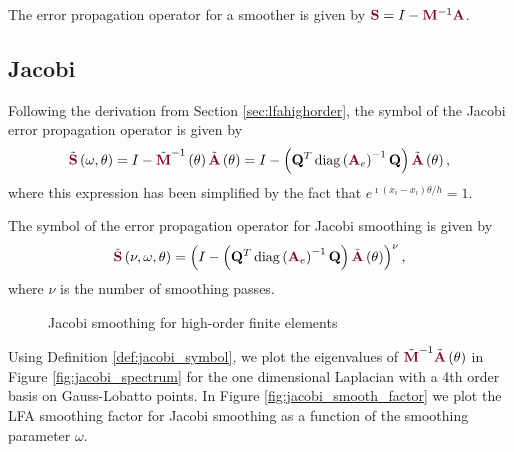 The error propagation operator for a smoother is given by ${\color{burgundy}\mathbf{S}} = I - {\color{burgundy}\mathbf{M}}^{-1} {\color{burgundy}\mathbf{A}}$.

\subsection{Jacobi}

Following the derivation from Section \ref{sec:lfahighorder}, the symbol of the Jacobi error propagation operator is given by
\begin{equation}
\tilde{{\color{burgundy}\mathbf{S}}} \left( \omega, \theta \right) = I - \tilde{{\color{burgundy}\mathbf{M}}}^{-1} \left( \theta \right) \tilde{{\color{burgundy}\mathbf{A}}} \left( \theta \right) = I - \left( \mathbf{Q}^T \diag \left( {\color{burgundy}\mathbf{A}}_e \right)^{-1} \mathbf{Q} \right) \tilde{{\color{burgundy}\mathbf{A}}} \left( \theta \right),
\end{equation}
where this expression has been simplified by the fact that $e^{\imath \left( x_i - x_i \right) \theta / h} = 1$.

\begin{definition}
The symbol of the error propagation operator for Jacobi smoothing is given by
\begin{equation}
\tilde{{\color{burgundy}\mathbf{S}}} \left( \nu, \omega, \theta \right) = \left( I - \left( \mathbf{Q}^T \diag \left( {\color{burgundy}\mathbf{A}}_e \right)^{-1} \mathbf{Q} \right) \tilde{{\color{burgundy}\mathbf{A}}} \left( \theta \right) \right)^\nu,
\end{equation}
where $\nu$ is the number of smoothing passes.
\label{def:jacobi_symbol}
\end{definition}

\begin{figure}[!tbp]
  \centering
  \hfill
  \caption{Jacobi smoothing for high-order finite elements}
\end{figure}

Using Definition \ref{def:jacobi_symbol}, we plot the eigenvalues of $\tilde{{\color{burgundy}\mathbf{M}}}^{-1} \tilde{{\color{burgundy}\mathbf{A}}} \left( \theta \right)$ in Figure \ref{fig:jacobi_spectrum} for the one dimensional Laplacian with a 4th order basis on Gauss-Lobatto points.
In Figure \ref{fig:jacobi_smooth_factor} we plot the LFA smoothing factor for Jacobi smoothing as a function of the smoothing parameter $\omega$.


